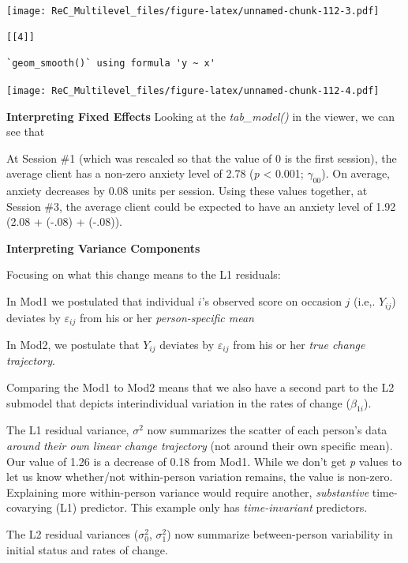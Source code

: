 \documentclass[
  11pt,
]{book}
\begin{document}
\texttt{[image: ReC\_Multilevel\_files/figure-latex/unnamed-chunk-112-3.pdf]}

\begin{verbatim}
[[4]]
\end{verbatim}

\begin{verbatim}
`geom_smooth()` using formula 'y ~ x'
\end{verbatim}

\texttt{[image: ReC\_Multilevel\_files/figure-latex/unnamed-chunk-112-4.pdf]}

\textbf{Interpreting Fixed Effects}
Looking at the \emph{tab\_model()} in the viewer, we can see that

At Session \#1 (which was rescaled so that the value of 0 is the first session), the average client has a non-zero anxiety level of 2.78 (\emph{p} \textless{} 0.001; \(\gamma _{00}\)). On average, anxiety decreases by 0.08 units per session. Using these values together, at Session \#3, the average client could be expected to have an anxiety level of 1.92 (2.08 + (-.08) + (-.08)).

\textbf{Interpreting Variance Components}

Focusing on what this change means to the L1 residuals:

In Mod1 we postulated that individual \(i\)'s observed score on occasion \(j\) (i.e,. \(Y_{ij}\)) deviates by \(\varepsilon _{ij}\) from his or her \emph{person-specific mean}

In Mod2, we postulate that \(Y_{ij}\) deviates by \(\varepsilon _{ij}\) from his or her \emph{true change trajectory}.

Comparing the Mod1 to Mod2 means that we also have a second part to the L2 submodel that depicts interindividual variation in the rates of change (\(\beta _{1i}\)).

The L1 residual variance, \(\sigma^{2}\) now summarizes the scatter of each person's data \emph{around their own linear change trajectory} (not around their own specific mean). Our value of 1.26 is a decrease of 0.18 from Mod1. While we don't get \emph{p} values to let us know whether/not within-person variation remains, the value is non-zero. Explaining more within-person variance would require another, \emph{substantive} time-covarying (L1) predictor. This example only has \emph{time-invariant} predictors.

The L2 residual variances (\(\sigma_{0 }^{2}\), \(\sigma_{1 }^{2}\)) now summarize between-person variability in initial status and rates of change.
\end{document}
